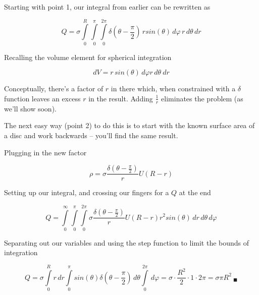 Starting with point 1, our integral from earlier can be rewritten as 

\begin{equation}
  Q =
  \sigma
  \int\limits_0^R
  \int\limits_0^\pi
  \int\limits_0^{2\pi}
  \delta(\theta - \frac \pi 2)
  \,r sin(\theta) \, d\varphi
  \,r \, d\theta
  \, dr
\end{equation}

Recalling the volume element for spherical integration

\begin{equation}
  dV = r\,sin(\theta)\,d\varphi r\,d\theta\ dr
\end{equation}

Conceptually, there's a factor of $r$ in there which, when constrained
with a $\delta$ function leaves an excess $r$ in the result.  Adding
$\frac 1 r$ eliminates the problem (as we'll show soon).

The next easy way (point 2) to do this is to start with the known
surface area of a disc and work backwards -- you'll find the same
result.

Plugging in the new factor

\begin{equation}
  \rho = \sigma \frac{\delta(\theta - \frac \pi 2)}{r} U(R - r)
\end{equation}

Setting up our integral, and crossing our fingers for a $Q$ at the end

\begin{equation}
  Q =
  \int\limits_0^\infty
  \int\limits_0^\pi
  \int\limits_0^{2\pi}
  \sigma \frac{\delta(\theta - \frac \pi 2)}{r} U(R - r)
  r^2sin(\theta)
  \, dr
  \, d\theta
  \, d\varphi
\end{equation}

Separating out our variables and using the step function to limit the
bounds of integration

\begin{equation}
  Q =
  \sigma
  \int\limits_0^R
  r
  \, dr
  \int\limits_0^\pi
  sin(\theta)
  \delta(\theta - \frac \pi 2)
  \, d\theta
  \int\limits_0^{2\pi}
  \, d\varphi
  = \sigma \cdot \frac{R^2}{2} \cdot 1 \cdot 2\pi
  = \sigma \pi R^2
  \ _\blacksquare
\end{equation}
